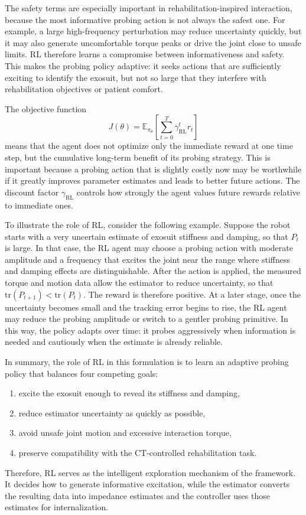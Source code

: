 \documentclass[11pt]{article}
\begin{document}
The safety terms are especially important in rehabilitation-inspired interaction, because the most informative probing action is not always the safest one. For example, a large high-frequency perturbation may reduce uncertainty quickly, but it may also generate uncomfortable torque peaks or drive the joint close to unsafe limits. RL therefore learns a compromise between informativeness and safety. This makes the probing policy adaptive: it seeks actions that are sufficiently exciting to identify the exosuit, but not so large that they interfere with rehabilitation objectives or patient comfort.

The objective function
\begin{equation}
J(\theta)=\mathbb{E}_{\pi_\theta}\left[\sum_{t=0}^{T}\gamma_{\mathrm{RL}}^t r_t\right]
\end{equation}
means that the agent does not optimize only the immediate reward at one time step, but the cumulative long-term benefit of its probing strategy. This is important because a probing action that is slightly costly now may be worthwhile if it greatly improves parameter estimates and leads to better future actions. The discount factor \(\gamma_{\mathrm{RL}}\) controls how strongly the agent values future rewards relative to immediate ones.

To illustrate the role of RL, consider the following example. Suppose the robot starts with a very uncertain estimate of exosuit stiffness and damping, so that \(P_t\) is large. In that case, the RL agent may choose a probing action with moderate amplitude and a frequency that excites the joint near the range where stiffness and damping effects are distinguishable. After the action is applied, the measured torque and motion data allow the estimator to reduce uncertainty, so that \(\mathrm{tr}(P_{t+1})<\mathrm{tr}(P_t)\). The reward is therefore positive. At a later stage, once the uncertainty becomes small and the tracking error begins to rise, the RL agent may reduce the probing amplitude or switch to a gentler probing primitive. In this way, the policy adapts over time: it probes aggressively when information is needed and cautiously when the estimate is already reliable.

In summary, the role of RL in this formulation is to learn an adaptive probing policy that balances four competing goals:
\begin{enumerate}
    \item excite the exosuit enough to reveal its stiffness and damping,
    \item reduce estimator uncertainty as quickly as possible,
    \item avoid unsafe joint motion and excessive interaction torque,
    \item preserve compatibility with the CT-controlled rehabilitation task.
\end{enumerate}
Therefore, RL serves as the intelligent exploration mechanism of the framework. It decides how to generate informative excitation, while the estimator converts the resulting data into impedance estimates and the controller uses those estimates for internalization.
\end{document}

